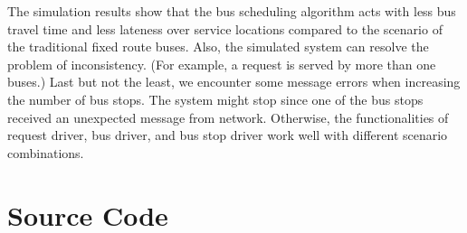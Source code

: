 \documentclass[runningheads]{llncs}
\begin{document}
The simulation results show that the bus scheduling algorithm acts with less bus travel time and less lateness over service locations compared to the scenario of the traditional fixed route buses. Also, the simulated system can resolve the problem of inconsistency. (For example, a request is served by more than one buses.) Last but not the least, we encounter some message errors when increasing the number of bus stops. The system might stop since one of the bus stops received an unexpected message from network. Otherwise, the functionalities of request driver, bus driver, and bus stop driver work well with different scenario combinations.

\newpage
\appendix
\section{Source Code}

% 
\end{document}
